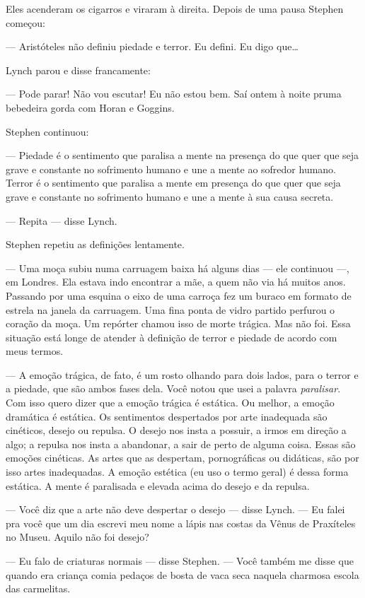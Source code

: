 Eles acenderam os cigarros e viraram à direita. Depois de uma pausa
Stephen começou:

 --- Aristóteles não definiu piedade e terror. Eu defini. Eu digo que\ldots{}

Lynch parou e disse francamente:

 --- Pode parar! Não vou escutar! Eu não estou bem. Saí ontem à noite pruma
bebedeira gorda com Horan e Goggins.

Stephen continuou:

 --- Piedade é o sentimento que paralisa a mente na presença do que quer
que seja grave e constante no sofrimento humano e une a mente ao
sofredor humano. Terror é o sentimento que paralisa a mente em presença
do que quer que seja grave e constante no sofrimento humano e une a
mente à sua causa secreta.

 --- Repita --- disse Lynch.

Stephen repetiu as definições lentamente.

 --- Uma moça subiu numa carruagem baixa há alguns dias --- ele continuou ---, em
Londres. Ela estava indo encontrar a mãe, a quem não via há muitos
anos. Passando por uma esquina o eixo de uma carroça fez um buraco em
formato de estrela na janela da carruagem. Uma fina ponta de vidro
partido perfurou o coração da moça. Um repórter chamou isso de morte
trágica. Mas não foi. Essa situação está longe de atender à definição
de terror e piedade de acordo com meus termos.

 --- A emoção trágica, de fato, é um rosto olhando para dois lados, para o
terror e a piedade, que são ambos fases dela. Você notou que usei a
palavra \textit{paralisar}. Com isso quero dizer que a emoção trágica é
estática. Ou melhor, a emoção dramática é estática. Os sentimentos
despertados por arte inadequada são cinéticos, desejo ou repulsa. O
desejo nos insta a possuir, a irmos em direção a algo; a repulsa nos
insta a abandonar, a sair de perto de alguma coisa. Essas são emoções
cinéticas. As artes que as despertam, pornográficas ou didáticas, são
por isso artes inadequadas. A emoção estética (eu uso o termo geral) é
dessa forma estática. A mente é paralisada e elevada acima do desejo e
da repulsa.

 --- Você diz que a arte não deve despertar o desejo --- disse Lynch. --- Eu falei
pra você que um dia escrevi meu nome a lápis nas costas da Vênus de
Praxíteles no Museu. Aquilo não foi desejo?

 --- Eu falo de criaturas normais --- disse Stephen. --- Você também me disse que
quando era criança comia pedaços de bosta de vaca seca naquela
charmosa escola das carmelitas.


